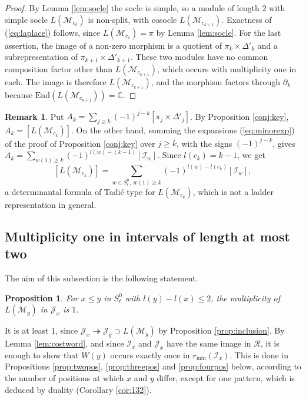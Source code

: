 \documentclass[a4paper,12pt,leqno]{amsart}
\newcommand{\bbC}{\mathbb{C}}
\newcommand{\caI}{\mathcal{I}}
\newcommand{\caJ}{\mathcal{J}}
\newcommand{\caM}{\mathcal{M}}
\newcommand{\caR}{\mathcal{R}}
\theoremstyle{plain}
\newtheorem{prop}[thm]{Proposition}
\theoremstyle{definition}
\theoremstyle{definition}
\newtheorem{rmk}[thm]{Remark}
\begin{document}
\begin{proof}
By Lemma \ref{lem:socle} the socle is simple, so a module of length $2$ with simple socle $L(\caM_{c_k})$
 is non-split, with cosocle $L(\caM_{c_{k+1}})$. Exactness of (\ref{eq:laplace}) follows, since
 $L(\caM_{c_1})=\pi$
  by Lemma \ref{lem:socle}. For the last assertion, the image of a non-zero morphism is a quotient
  of $\pi_k\times\Delta'_k$
   and a subrepresentation of $\pi_{k+1}\times\Delta'_{k+1}$. These two modules have no common
   composition factor
    other than $L(\caM_{c_{k+1}})$, which occurs with multiplicity one in each. The image is
    therefore $L(\caM_{c_{k+1}})$,
     and the morphism factors through $\partial_k$ because $\mathrm{End}(L(\caM_{c_{k+1}}))=\bbC$.
\end{proof}

\begin{rmk}\label{rmk:tadic_ck} Put $A_k=\sum_{j\geq k}(-1)^{j-k}[\pi_j\times\Delta'_j]$. By
Proposition \ref{conj:key}, $A_k=[L(\caM_{c_k})]$. On the other hand, summing the expansions
(\ref{eq:minorexp}) of the proof of Proposition \ref{conj:key} over $j\geq k$, with the signs
$(-1)^{j-k}$, gives $A_k=\sum_{w(1)\geq k}(-1)^{l(w)-(k-1)}[\caI_w]$. Since $l(c_k)=k-1$, we get
\[[L(\caM_{c_k})]=\sum_{w\in S^0_t,\ w(1)\geq k}(-1)^{l(w)-l(c_k)}[\caI_w],\]
a determinantal formula of Tadi\'c type for $L(\caM_{c_k})$, which is not a ladder representation in general.
\end{rmk}


\subsection{Multiplicity one in intervals of length at most two}\label{ssec:multone}
The aim of this subsection is the following statement.

\begin{prop}\label{prop:multone} For $x\leq y$ in $S_t^0$ with $l(y)-l(x)\leq2$, the multiplicity
of $L(\caM_y)$ in $\caJ_x$ is $1$.
\end{prop}

It is at least $1$, since $\caJ_x\twoheadrightarrow\caJ_y\supset L(\caM_y)$ by Proposition
\ref{prop:inclusion}. By Lemma \ref{lem:costword}, and since $\caI_x$ and
$\caJ_x$ have the same image in $\caR$, it is enough to show that $W(y)$ occurs exactly once in
$r_{\min}(\caI_x)$. This is done in Propositions \ref{prop:twopos}, \ref{prop:threepos} and
\ref{prop:fourpos} below, according to the number of positions at which $x$ and $y$ differ, except for
one pattern, which is deduced by duality (Corollary \ref{cor:132}).
\end{document}
